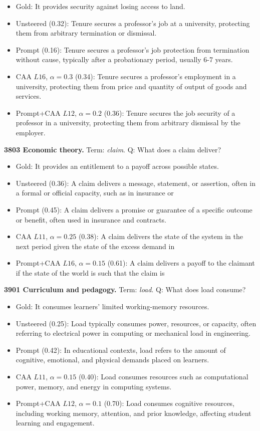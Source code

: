 \begin{itemize}\setlength{\itemsep}{0.15em}\setlength{\parsep}{0pt}\setlength{\topsep}{0.2em}
\item Gold: It provides security against losing access to land.
\item Unsteered (0.32): Tenure secures a professor's job at a university, protecting them from arbitrary termination or dismissal.
\item Prompt (0.16): Tenure secures a professor's job protection from termination without cause, typically after a probationary period, usually 6-7 years.
\item CAA $L16$, $\alpha=0.3$ (0.34): Tenure secures a professor's employment in a university, protecting them from price and quantity of output of goods and services.
\item Prompt+CAA $L12$, $\alpha=0.2$ (0.36): Tenure secures the job security of a professor in a university, protecting them from arbitrary dismissal by the employer.
\end{itemize}
\medskip\noindent\textbf{3803 Economic theory.} Term: \emph{claim}.
Q: What does a claim deliver?
\begin{itemize}\setlength{\itemsep}{0.15em}\setlength{\parsep}{0pt}\setlength{\topsep}{0.2em}
\item Gold: It provides an entitlement to a payoff across possible states.
\item Unsteered (0.36): A claim delivers a message, statement, or assertion, often in a formal or official capacity, such as in insurance or
\item Prompt (0.45): A claim delivers a promise or guarantee of a specific outcome or benefit, often used in insurance and contracts.
\item CAA $L11$, $\alpha=0.25$ (0.38): A claim delivers the state of the system in the next period given the state of the excess demand in
\item Prompt+CAA $L16$, $\alpha=0.15$ (0.61): A claim delivers a payoff to the claimant if the state of the world is such that the claim is
\end{itemize}
\medskip\noindent\textbf{3901 Curriculum and pedagogy.} Term: \emph{load}.
Q: What does load consume?
\begin{itemize}\setlength{\itemsep}{0.15em}\setlength{\parsep}{0pt}\setlength{\topsep}{0.2em}
\item Gold: It consumes learners' limited working-memory resources.
\item Unsteered (0.25): Load typically consumes power, resources, or capacity, often referring to electrical power in computing or mechanical load in engineering.
\item Prompt (0.42): In educational contexts, load refers to the amount of cognitive, emotional, and physical demands placed on learners.
\item CAA $L11$, $\alpha=0.15$ (0.40): Load consumes resources such as computational power, memory, and energy in computing systems.
\item Prompt+CAA $L12$, $\alpha=0.1$ (0.70): Load consumes cognitive resources, including working memory, attention, and prior knowledge, affecting student learning and engagement.
\end{itemize}
